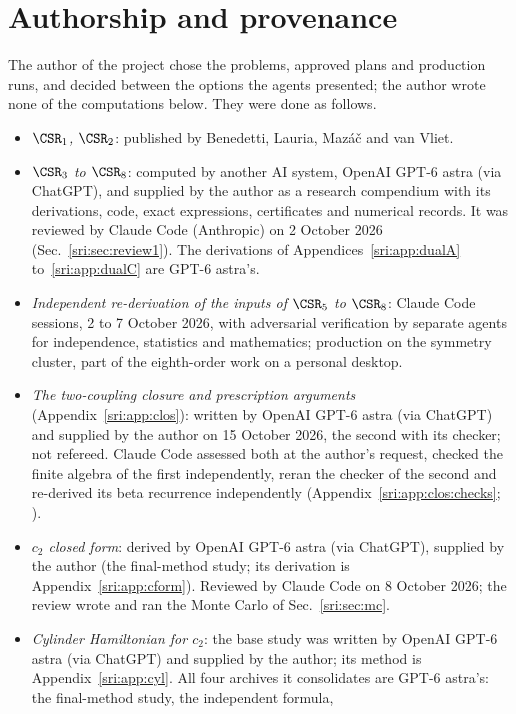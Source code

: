 \section{Authorship and provenance}\label{sri:sec:prov}
The author of the project chose the problems, approved plans and production runs, and decided between the options
the agents presented; the author wrote none of the computations below. They were done as follows.
\begin{itemize}
\item \emph{$\CSR_1$, $\CSR_2$}: published by Benedetti, Lauria, Maz\'a\v c and van Vliet.
\item \emph{$\CSR_3$ to $\CSR_8$}: computed by another AI system, OpenAI GPT-6 astra (via ChatGPT), and supplied by the
 author as a research compendium with its derivations, code, exact expressions, certificates and numerical records. It
 was reviewed by Claude Code (Anthropic) on 2 October 2026 (Sec.~\ref{sri:sec:review1}). The derivations of
 Appendices~\ref{sri:app:dualA} to~\ref{sri:app:dualC} are GPT-6 astra's.
\item \emph{Independent re-derivation of the inputs of $\CSR_5$ to $\CSR_8$}: Claude Code sessions, 2 to 7 October
 2026, with adversarial verification by separate agents for independence, statistics and mathematics; production on
 the symmetry cluster, part of the eighth-order work on a personal desktop.
\item \emph{The two-coupling closure and prescription arguments} (Appendix~\ref{sri:app:clos}): written by OpenAI GPT-6
 astra (via ChatGPT) and supplied by the author on 15 October 2026, the second with its checker; not refereed. Claude
 Code assessed both at the author's request, checked the finite algebra of the first independently, reran the checker
 of the second and re-derived its beta recurrence independently (Appendix~\ref{sri:app:clos:checks};
 ).
\item \emph{$c_2$ closed form}: derived by OpenAI GPT-6 astra (via ChatGPT), supplied by the author (the final-method
 study; its derivation is Appendix~\ref{sri:app:cform}). Reviewed by Claude Code on 8 October 2026; the review wrote and
 ran the Monte Carlo of Sec.~\ref{sri:sec:mc}.
\item \emph{Cylinder Hamiltonian for $c_2$}: the base study was written by OpenAI GPT-6 astra (via ChatGPT) and supplied
 by the author; its method is Appendix~\ref{sri:app:cyl}. All four archives it consolidates are GPT-6 astra's: the final-method study, the independent formula,

\end{itemize}
